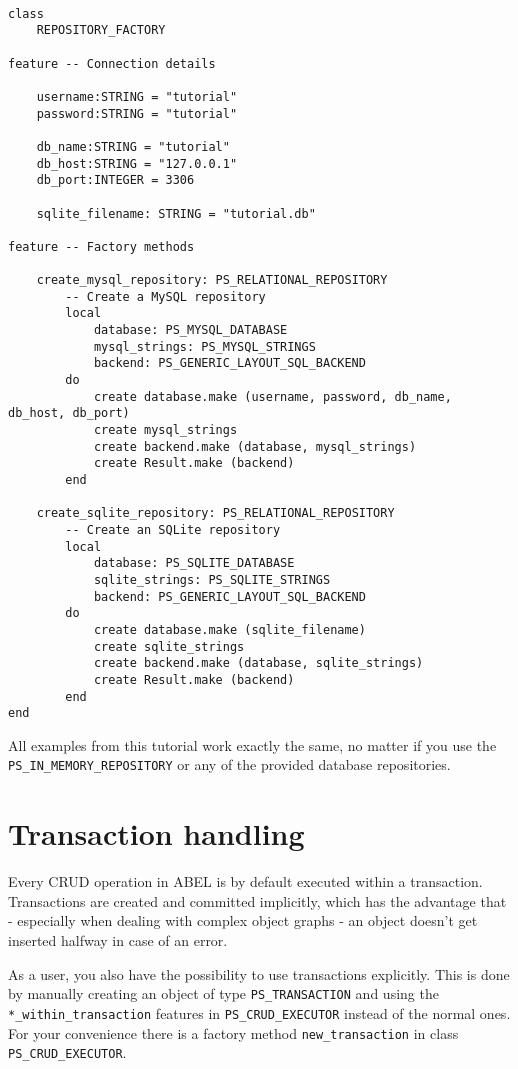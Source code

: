 \documentclass[a4paper,12pt]{report}
\begin{document}
\begin{lstlisting}[language=OOSC2Eiffel, captionpos=b, caption={Setting up a MySQL and a SQLite repository}, label={lst:advanced_initialization}]

class 
	REPOSITORY_FACTORY

feature -- Connection details
	
	username:STRING = "tutorial"
	password:STRING = "tutorial"

	db_name:STRING = "tutorial"
	db_host:STRING = "127.0.0.1"
	db_port:INTEGER = 3306

	sqlite_filename: STRING = "tutorial.db"

feature -- Factory methods

	create_mysql_repository: PS_RELATIONAL_REPOSITORY
		-- Create a MySQL repository
		local
			database: PS_MYSQL_DATABASE
			mysql_strings: PS_MYSQL_STRINGS
			backend: PS_GENERIC_LAYOUT_SQL_BACKEND
		do
			create database.make (username, password, db_name, db_host, db_port)
			create mysql_strings
			create backend.make (database, mysql_strings)
			create Result.make (backend)
		end

	create_sqlite_repository: PS_RELATIONAL_REPOSITORY
		-- Create an SQLite repository
		local
			database: PS_SQLITE_DATABASE
			sqlite_strings: PS_SQLITE_STRINGS
			backend: PS_GENERIC_LAYOUT_SQL_BACKEND
		do
			create database.make (sqlite_filename)
			create sqlite_strings
			create backend.make (database, sqlite_strings)
			create Result.make (backend)
		end
end

\end{lstlisting}

All examples from this tutorial work exactly the same, no matter if you use the \lstinline!PS_IN_MEMORY_REPOSITORY! or any of the provided database repositories.

\chapter{Transaction handling}

Every CRUD operation in ABEL is by default executed within a transaction. 
Transactions are created and committed implicitly, which has the advantage that - especially when dealing with complex object graphs - an object doesn't get inserted halfway in case of an error.

As a user, you also have the possibility to use transactions explicitly. 
This is done by manually creating an object of type \lstinline!PS_TRANSACTION! and using the \lstinline!*_within_transaction! features in \lstinline!PS_CRUD_EXECUTOR! instead of the normal ones.
For your convenience there is a factory method \lstinline{new_transaction} in class \lstinline!PS_CRUD_EXECUTOR!.
\end{document}
